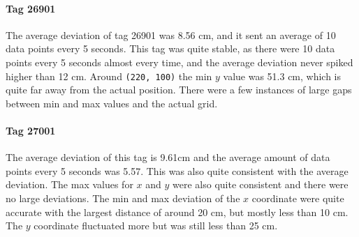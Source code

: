 \paragraph{Tag 26901}
The average deviation of tag 26901 was 8.56 cm, and it sent an average of 10 data points every 5 seconds.
This tag was quite stable, as there were 10 data points every 5 seconds almost every time, and the average deviation never spiked higher than 12 cm.
Around \texttt{(220, 100)} the min $y$ value was 51.3 cm, which is quite far away from the actual position.
There were a few instances of large gaps between min and max values and the actual grid.

\paragraph{Tag 27001}
The average deviation of this tag is 9.61cm and the average amount of data points every 5 seconds was 5.57.
This was also quite consistent with the average deviation. 
The max values for $x$ and $y$ were also quite consistent and there were no large deviations.
The min and max deviation of the $x$ coordinate were quite accurate with the largest distance of around 20 cm, but mostly less than 10 cm.
The $y$ coordinate fluctuated more but was still less than 25 cm.

